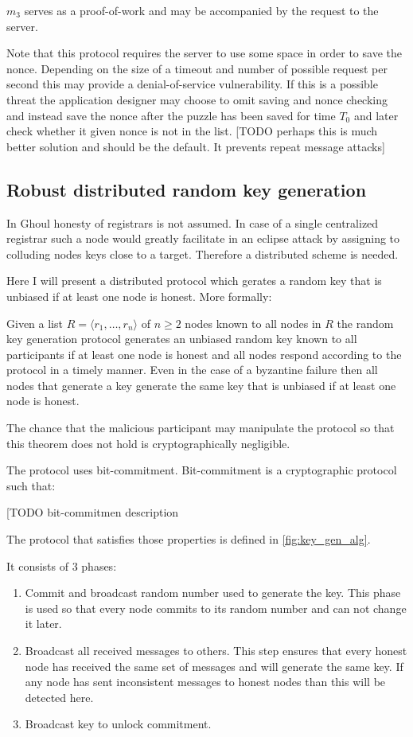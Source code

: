 $m_3$ serves as a proof-of-work and may be accompanied by the request to the
server.

Note that this protocol requires the server to use some space in order to save
the nonce. Depending on the size of a timeout and number of possible request per
second this may provide a denial-of-service vulnerability. If this is a possible
threat the application designer may choose to omit saving and nonce checking and
instead save the nonce after the puzzle has been saved for time $T_0$ and later
check whether it given nonce is not in the list. [TODO perhaps this is much
better solution and should be the default. It prevents repeat message attacks]

\subsection{Robust distributed random key generation}

In Ghoul honesty of registrars is not assumed. In case of a single centralized
registrar such a node would greatly facilitate in an eclipse attack by
assigning to colluding nodes keys close to a target. Therefore a distributed
scheme is needed.

Here  I will present a distributed protocol which gerates a random key that is
unbiased if at least one node is honest. More formally:

\begin{theorem}
  Given a list $R = \langle r_1, \ldots, r_n \rangle$ of $n \geq 2$ nodes known
  to all nodes in $R$ the random key generation protocol generates an unbiased
  random key known to all participants if at least one node is honest and all
  nodes respond according to the protocol in a timely manner. Even in the case
  of a byzantine failure then all nodes that generate a key generate the same
  key that is unbiased if at least one node is honest.

  The chance that the malicious participant may manipulate the protocol so that
  this theorem does not hold is cryptographically negligible.
\end{theorem}

The protocol uses bit-commitment. Bit-commitment is a cryptographic protocol
such that:

[TODO bit-commitmen description

The protocol that satisfies those properties is defined in \ref{fig:key_gen_alg}.

It consists of 3 phases:
\begin{enumerate}
  \item Commit and broadcast random number used to generate the key. This phase
    is used so that every node commits to its random number and can not change
    it later.
  \item Broadcast all received messages to others. This step ensures that every
    honest node has received the same set of messages and will generate the same
    key. If any node has sent inconsistent messages to honest nodes
    than this will be detected here.
  \item Broadcast key to unlock commitment.
\end{enumerate}

